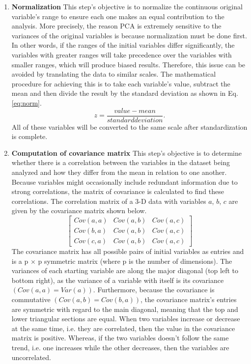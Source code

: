 \begin{enumerate}
  \item \textbf{Normalization} This step's objective is to normalize the continuous original variable's range to ensure each one makes an equal contribution to the analysis. More precisely, the reason \ac{PCA} is extremely sensitive to the variances of the original variables is because normalization must be done first. In other words, if the ranges of the initial variables differ significantly, the variables with greater ranges will take precedence over the variables with smaller ranges, which will produce biased results. Therefore, this issue can be avoided by translating the data to similar scales. The mathematical procedure for achieving this is to take each variable's value, subtract the mean and then divide the result by the standard deviation as shown in Eq. \ref{eq:norm}.
  \begin{equation}
    \label{eq:norm}
    \mathit{z} = \mathit{\frac{value-mean}{standard deviation}}.
  \end{equation}
  All of these variables will be converted to the same scale after standardization is complete.
  \item \textbf{Computation of covariance matrix} This step's objective is to determine whether there is a correlation between the variables in the dataset being analyzed and how they differ from the mean in relation to one another. Because variables might occasionally include redundant information due to strong correlations, the matrix of covariance is calculated to find these correlations. The correlation matrix of a 3-D data with variables $a$, $b$, $c$ are given by the covariance matrix shown below.\cite{abdi2010principal}
\begin{equation}
  \label{eq:cov_mat}
    \begin{bmatrix}
    Cov(a,a) & Cov(a,b) & Cov(a,c)\\
    Cov(b,a) & Cov(a,b) & Cov(a,c)\\
    Cov(c,a) & Cov(a,b) & Cov(a,c)
  \end{bmatrix}
\end{equation}
  The covariance matrix has all possible pairs of initial variables as entries and is a p × p symmetric matrix (where p is the number of dimensions).
  The variances of each starting variable are along the major diagonal (top left to bottom right), as the variance of a variable with itself is its covariance $(Cov(a,a)=Var(a))$. Furthermore, because the covariance is commutative $(Cov(a,b)=Cov(b,a))$, the covariance matrix's entries are symmetric with regard to the main diagonal, meaning that the top and lower triangular sections are equal. When two variables increase or decrease at the same time, i.e. they are correlated, then the value in the covariance matrix is positive. Whereas, if the two variables doesn't follow the same trend, i.e. one increases while the other decreases, then the variables are uncorrelated.\cite{abdi2010principal}

\end{enumerate}
